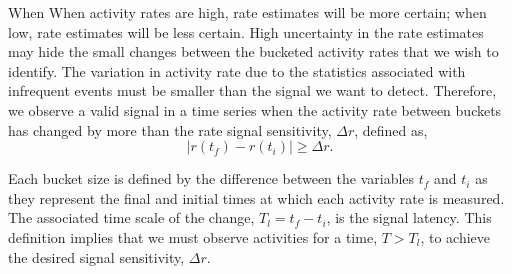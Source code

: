 \documentclass{article}
\begin{document}
When
\reversemarginpar\marginpar{\raggedleft
%
    \begin{tikzpicture}[scale=0.26]]
\draw [red, very thick, rotate around={60: (1.5, 2.598076211353316)}] (0.8, 1.898076211353316) rectangle(2.2, 3.298076211353316);
%
\draw [very thick, <->] (0.25000000000000006, 0.4330127018922193) -- (1.25, 2.165063509461097) ;
\draw [very thick, <->] (1.75, 2.165063509461097) -- (2.75, 0.4330127018922193) ;
\draw [very thick, <->] (2.5, 0) -- (0.5, 0) ;
%
\draw [orange, ultra thick] (0,0) circle [radius= 0.5 ];
\draw [yellow, ultra thick] ( 1.5 , 2.59807621135 ) circle [radius= 0.5 ];
\draw [green,  ultra thick] ( 3.0 , 0 ) circle [radius= 0.5 ];
    \end{tikzpicture}
%
%
}
  When activity rates are high, rate estimates will be more certain; when low, rate estimates will be less certain. High uncertainty
in the rate estimates may hide the small changes between the bucketed activity rates that we wish to identify.  The variation in activity rate due to the statistics
associated with infrequent events must be smaller than the signal we want to detect. Therefore, we observe
a valid signal in a time series when the activity rate between buckets has changed by more than the rate signal sensitivity, $\Delta r$, defined as,
\begin{equation}
    \label{eq:signal}
    | r(t_f) - r(t_i) | \geq \Delta r.
\end{equation}

Each bucket size is defined by the difference between the variables $t_f$ and $t_i$ as they represent the final and initial times at which each activity rate is measured. The associated time 
scale of the change, $T_l = t_f - t_i$, is the signal latency.  This definition implies that we 
must observe activities for a time, $T > T_l$, to achieve the desired signal sensitivity, $\Delta r$.
\end{document}
